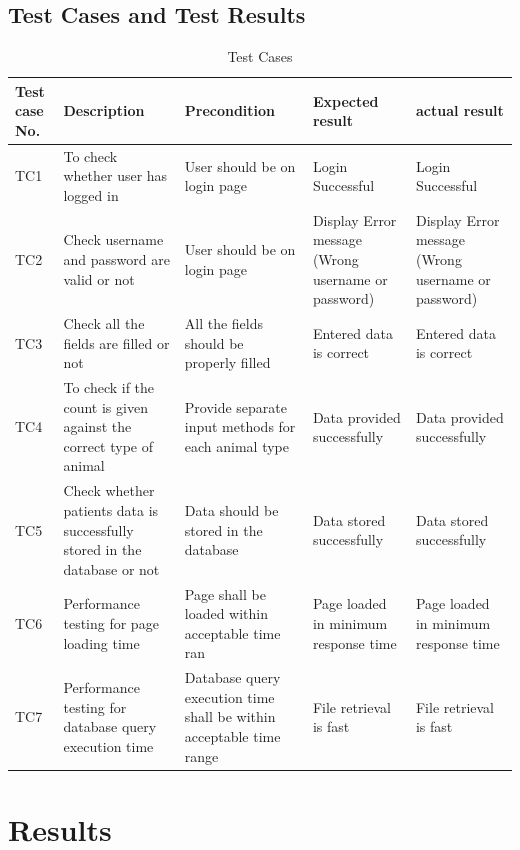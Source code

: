 \documentclass[oneside,a4paper,12pt]{book}
\begin{document}
   \section{Test Cases and Test Results}
  \begin{table}[!htbp]
\begin{center}
\def\arraystretch{1.5}
\begin{tabularx}{\textwidth}{| X | X | X | X | X |}
\hline
\multirow{1}{*}{Test case No.} & \multirow{1}{*}{Description}	& \multirow{1}{*}{Precondition} & \multirow{1}{*}{Expected result } & \multirow{1}{*}{actual result}  \\ \hline
TC1	& To check whether user has logged in	& User should be on login page	& Login Successful &	Login Successful \\ \hline
TC2	& Check username and password are valid or not &	User should be on login page &	Display Error message (Wrong username or password) &	Display Error message (Wrong username or password) \\ \hline
TC3 &	Check all the ﬁelds are ﬁlled or not	& All the ﬁelds should be properly ﬁlled &	Entered data is correct	& Entered data is correct \\ \hline
TC4	& To check if the count is given against the correct type of animal &	Provide separate input methods for each animal type &	Data provided successfully	& Data provided successfully \\ \hline
TC5	& Check whether patients data is successfully stored in the database or not &	Data should be stored in the database	& Data stored successfully &	Data stored successfully \\ \hline
TC6	& Performance testing for page loading time	& Page shall be loaded within acceptable time ran &	Page loaded in minimum response time &	Page loaded in minimum response time \\ \hline
TC7 &	Performance testing for database query execution time &	Database query execution time shall be within acceptable time range &	File retrieval is fast &	File retrieval is fast \\  \hline

\end{tabularx}
\end{center}
\caption{Test Cases}
\label{tab:usecase}
\end{table}
   
\chapter{Results}
\end{document}
